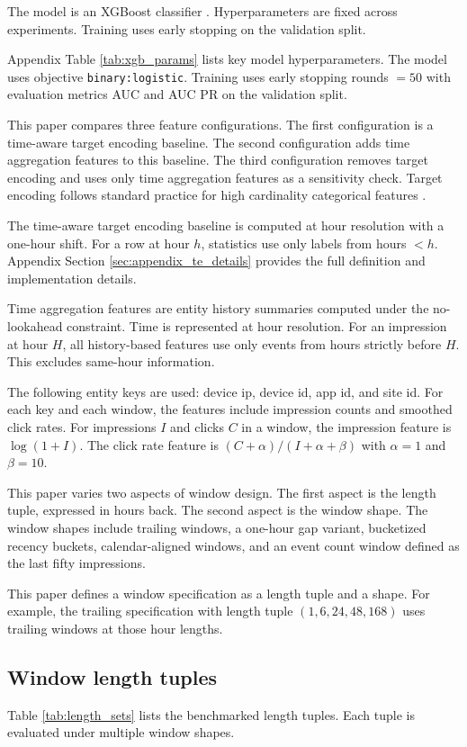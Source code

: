 The model is an XGBoost classifier \citep{chen2016xgboost}.
Hyperparameters are fixed across experiments.
Training uses early stopping on the validation split.

Appendix Table \ref{tab:xgb_params} lists key model hyperparameters.
The model uses objective \texttt{binary:logistic}.
Training uses early stopping rounds $=50$ with evaluation metrics AUC and AUC PR on the validation split.

This paper compares three feature configurations.
The first configuration is a time-aware target encoding baseline.
The second configuration adds time aggregation features to this baseline.
The third configuration removes target encoding and uses only time aggregation features as a sensitivity check.
Target encoding follows standard practice for high cardinality categorical features \citep{micci2001preprocessing}.

The time-aware target encoding baseline is computed at hour resolution with a one-hour shift.
For a row at hour $h$, statistics use only labels from hours $< h$.
Appendix Section \ref{sec:appendix_te_details} provides the full definition and implementation details.

Time aggregation features are entity history summaries computed under the no-lookahead constraint.
Time is represented at hour resolution.
For an impression at hour $H$, all history-based features use only events from hours strictly before $H$.
This excludes same-hour information.

The following entity keys are used: device ip, device id, app id, and site id.
For each key and each window, the features include impression counts and smoothed click rates.
For impressions $I$ and clicks $C$ in a window, the impression feature is $\log(1+I)$.
The click rate feature is $(C + \alpha) / (I + \alpha + \beta)$ with $\alpha=1$ and $\beta=10$.

This paper varies two aspects of window design.
The first aspect is the length tuple, expressed in hours back.
The second aspect is the window shape.
The window shapes include trailing windows, a one-hour gap variant, bucketized recency buckets, calendar-aligned windows, and an event count window defined as the last fifty impressions.

This paper defines a window specification as a length tuple and a shape.
For example, the trailing specification with length tuple $(1, 6, 24, 48, 168)$ uses trailing windows at those hour lengths.

\subsection{Window length tuples}
Table \ref{tab:length_sets} lists the benchmarked length tuples.
Each tuple is evaluated under multiple window shapes.

